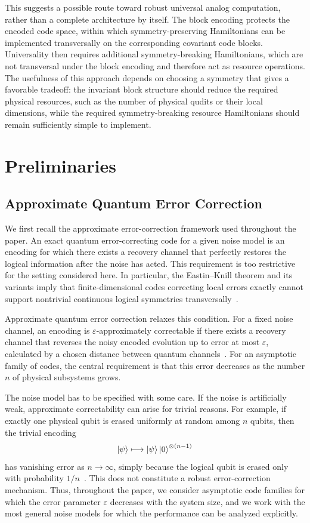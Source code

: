 \documentclass[10pt,twocolumn,superscriptaddress,aps,amsmath,amssymb,citeautoscript,floatfix,prx]{revtex4-2}
\theoremstyle{plain}
\theoremstyle{plain}
\theoremstyle{plain}
\theoremstyle{plain}
\theoremstyle{plain}
\theoremstyle{plain}
\begin{document}
This suggests a possible route toward robust universal analog computation, rather than a complete architecture by itself. The block encoding protects the encoded code space, within which symmetry-preserving Hamiltonians can be implemented transversally on the corresponding covariant code blocks. Universality then requires additional symmetry-breaking Hamiltonians, which are not transversal under the block encoding and therefore act as resource operations. The usefulness of this approach depends on choosing a symmetry that gives a favorable tradeoff: the invariant block structure should reduce the required physical resources, such as the number of physical qudits or their local dimensions, while the required symmetry-breaking resource Hamiltonians should remain sufficiently simple to implement.

\section{Preliminaries}\label{sec:main_prelim}

\subsection{Approximate Quantum Error Correction}\label{subsec:main_AQEC}

We first recall the approximate error-correction framework used throughout the paper. An exact quantum error-correcting code for a given noise model is an encoding for which there exists a recovery channel that perfectly restores the logical information after the noise has acted. This requirement is too restrictive for the setting considered here. In particular, the Eastin--Knill theorem and its variants imply that finite-dimensional codes correcting local errors exactly cannot support nontrivial continuous logical symmetries transversally~\cite{Eastin2009}.

Approximate quantum error correction relaxes this condition. For a fixed noise channel, an encoding is $\varepsilon$-approximately correctable if there exists a recovery channel that reverses the noisy encoded evolution up to error at most $\varepsilon$, calculated by a chosen distance between quantum channels~\cite{Beny2010}. For an asymptotic family of codes, the central requirement is that this error decreases as the number $n$ of physical subsystems grows.

The noise model has to be specified with some care. If the noise is artificially weak, approximate correctability can arise for trivial reasons. For example, if exactly one physical qubit is erased uniformly at random among $n$ qubits, then the trivial encoding
$$
\ket\psi
\longmapsto
\ket\psi\ket 0^{\otimes(n-1)}
$$
has vanishing error as $n\to\infty$, simply because the logical qubit is erased only with probability $1/n$~\cite{Yi2024}. This does not constitute a robust error-correction mechanism. Thus, throughout the paper, we consider asymptotic code families for which the error parameter $\varepsilon$ decreases with the system size, and we work with the most general noise models for which the performance can be analyzed explicitly.
\end{document}
